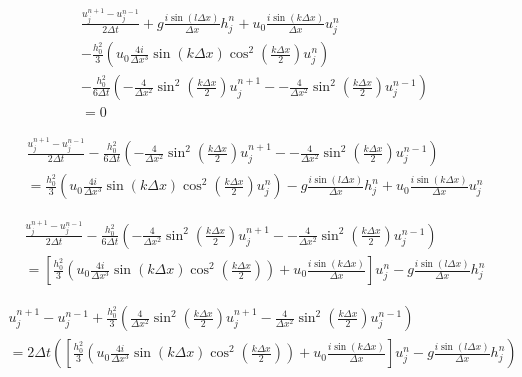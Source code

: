 \documentclass[12pt]{article}
\begin{document}
\begin{multline}
\frac{u^{n+1}_j - u^{n-1}_j}{2\Delta t} + g\frac{i \sin\left(l \Delta x\right)}{\Delta x} h^n_j + u_0\frac{i \sin\left(k \Delta x\right)}{\Delta x} u^n_j \\- \frac{h_0^2}{3}\left(u_0 \frac{4i}{\Delta x^3}\sin\left(k\Delta x\right) \cos^2\left(\frac{k\Delta x}{2}\right) u^{n}_{j}  \right)  \\
- \frac{h_0^2}{6 \Delta t} \left(-\frac{4}{\Delta x^2}\sin^2\left(\frac{k\Delta x}{2}\right) u^{n+1}_{j} - -\frac{4}{\Delta x^2}\sin^2\left(\frac{k\Delta x}{2}\right) u^{n-1}_{j}  \right)
\\ = 0
\end{multline}

\begin{multline}
\frac{u^{n+1}_j - u^{n-1}_j}{2\Delta t} 
- \frac{h_0^2}{6 \Delta t} \left(-\frac{4}{\Delta x^2}\sin^2\left(\frac{k\Delta x}{2}\right) u^{n+1}_{j} - -\frac{4}{\Delta x^2}\sin^2\left(\frac{k\Delta x}{2}\right) u^{n-1}_{j}  \right)
\\ = \frac{h_0^2}{3}\left(u_0 \frac{4i}{\Delta x^3}\sin\left(k\Delta x\right) \cos^2\left(\frac{k\Delta x}{2}\right) u^{n}_{j}  \right)   - g\frac{i \sin\left(l \Delta x\right)}{\Delta x} h^n_j + u_0\frac{i \sin\left(k \Delta x\right)}{\Delta x} u^n_j
\end{multline}

\begin{multline}
\frac{u^{n+1}_j - u^{n-1}_j}{2\Delta t} 
- \frac{h_0^2}{6 \Delta t} \left(-\frac{4}{\Delta x^2}\sin^2\left(\frac{k\Delta x}{2}\right) u^{n+1}_{j} - -\frac{4}{\Delta x^2}\sin^2\left(\frac{k\Delta x}{2}\right) u^{n-1}_{j}  \right)
\\ =  \left[\frac{h_0^2}{3}\left(u_0 \frac{4i}{\Delta x^3}\sin\left(k\Delta x\right) \cos^2\left(\frac{k\Delta x}{2}\right)  \right) + u_0\frac{i \sin\left(k \Delta x\right)}{\Delta x} \right] u^n_j   - g\frac{i \sin\left(l \Delta x\right)}{\Delta x} h^n_j
\end{multline}

\begin{multline}
u^{n+1}_j - u^{n-1}_j
+ \frac{h_0^2}{3} \left(\frac{4}{\Delta x^2}\sin^2\left(\frac{k\Delta x}{2}\right) u^{n+1}_{j} -\frac{4}{\Delta x^2}\sin^2\left(\frac{k\Delta x}{2}\right) u^{n-1}_{j}  \right)
\\ =  2 \Delta t\left(\left[\frac{h_0^2}{3}\left(u_0 \frac{4i}{\Delta x^3}\sin\left(k\Delta x\right) \cos^2\left(\frac{k\Delta x}{2}\right)  \right) + u_0\frac{i \sin\left(k \Delta x\right)}{\Delta x} \right] u^n_j   - g\frac{i \sin\left(l \Delta x\right)}{\Delta x} h^n_j\right)
\end{multline}
\end{document}
